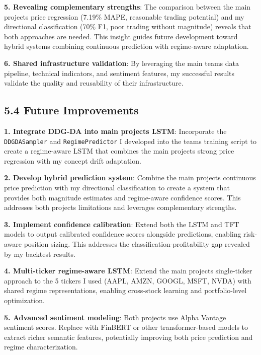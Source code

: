 \documentclass[
]{article}
\begin{document}
\textbf{5. Revealing complementary strengths}: The comparison between
the main project\textquotesingle s price regression (7.19\% MAPE,
reasonable trading potential) and my directional classification (70\%
F1, poor trading without magnitude) reveals that both approaches are
needed. This insight guides future development toward hybrid systems
combining continuous prediction with regime-aware adaptation.

\textbf{6. Shared infrastructure validation}: By leveraging the main
team\textquotesingle s data pipeline, technical indicators, and
sentiment features, my successful results validate the quality and
reusability of their infrastructure.

\subsection{5.4 Future Improvements}\label{54-future-improvements}

\textbf{1. Integrate DDG-DA into main project\textquotesingle s LSTM}:
Incorporate the \texttt{DDGDASampler} and \texttt{RegimePredictor} I
developed into the team\textquotesingle s training script to create a
regime-aware LSTM that combines the main project\textquotesingle s
strong price regression with my concept drift adaptation.

\textbf{2. Develop hybrid prediction system}: Combine the main
project\textquotesingle s continuous price prediction with my
directional classification to create a system that provides both
magnitude estimates and regime-aware confidence scores. This addresses
both projects\textquotesingle{} limitations and leverages complementary
strengths.

\textbf{3. Implement confidence calibration}: Extend both the LSTM and
TFT models to output calibrated confidence scores alongside predictions,
enabling risk-aware position sizing. This addresses the
classification-profitability gap revealed by my backtest results.

\textbf{4. Multi-ticker regime-aware LSTM}: Extend the main
project\textquotesingle s single-ticker approach to the 5 tickers I used
(AAPL, AMZN, GOOGL, MSFT, NVDA) with shared regime representations,
enabling cross-stock learning and portfolio-level optimization.

\textbf{5. Advanced sentiment modeling}: Both projects use Alpha Vantage
sentiment scores. Replace with FinBERT or other transformer-based models
to extract richer semantic features, potentially improving both price
prediction and regime characterization.
\end{document}
